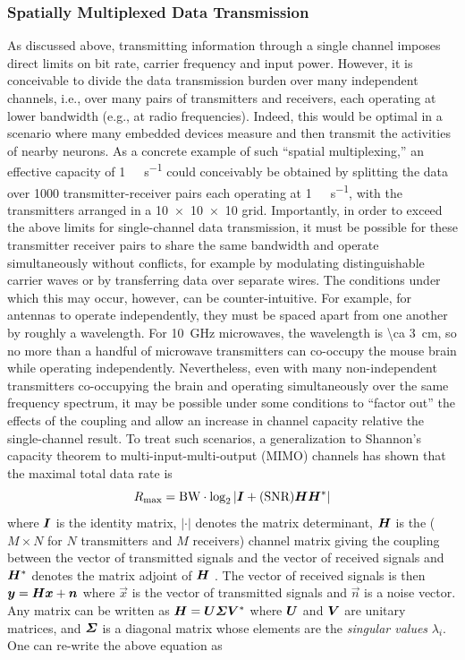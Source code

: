 \subsubsection{Spatially Multiplexed Data Transmission}

As discussed above, transmitting information through a single channel imposes direct limits on bit rate, carrier frequency and input power.
However, it is conceivable to divide the data transmission burden over many independent channels, i.e., over many pairs of transmitters and receivers, each operating at lower bandwidth (e.g., at radio frequencies).
Indeed, this would be optimal in a scenario where many embedded devices measure and then transmit the activities of nearby neurons.
As a concrete example of such ``spatial multiplexing,'' an effective capacity of \SI{1}{\tera\bit\per\second} could conceivably be obtained by splitting the data over \num{1000} transmitter-receiver pairs each operating at \SI{1}{\giga\bit\per\second}, with the transmitters arranged in a \num{10 x 10 x 10} grid.
Importantly, in order to exceed the above limits for single-channel data transmission, it must be possible for these transmitter receiver pairs to share the same bandwidth and operate simultaneously without conflicts, for example by modulating distinguishable carrier waves or by transferring data over separate wires.
The conditions under which this may occur, however, can be counter-intuitive.
For example, for antennas to operate independently, they must be spaced apart from one another by roughly a wavelength.
For \SI{10}{\giga\hertz} microwaves, the wavelength is \SI{\ca 3}{\centi\meter}, so no more than a handful of microwave transmitters can co-occupy the mouse brain while operating independently.
Nevertheless, even with many non-independent transmitters co-occupying the brain and operating simultaneously over the same frequency spectrum, it may be possible under some conditions to ``factor out'' the effects of the coupling and allow an increase in channel capacity relative the single-channel result.
To treat such scenarios, a generalization to Shannon's capacity theorem to multi-input-multi-output (MIMO) channels has shown that the maximal total data rate is
\[R\sub{max} = \BW \cdot \log_2\left| \mat{I} + ( \SNR ) \mat{H}\mat{H}^* \right|\]
where $\mat{I}$ is the identity matrix, $|\cdot|$ denotes the matrix determinant, $\mat{H}$ is the ($M \times N$ for $N$ transmitters and $M$ receivers) channel matrix giving the coupling between the vector of transmitted signals and the vector of received signals and $\mat{H}^*$ denotes the matrix adjoint of $\mat{H}$ \cite{tulino04}. The vector of received signals is then $\vec{y}=\mat{H}\vec{x}+\vec{n}$ where $\vec{x}$ is the vector of transmitted signals and $\vec{n}$ is a noise vector. Any matrix can be written as $\mat{H}=\mat{U}\mat{\Sigma}\mat{V}^*$ where $\mat{U}$ and $\mat{V}$ are unitary matrices, and $\mat{\Sigma}$ is a diagonal matrix whose elements are the \emph{singular values} $\lambda_i$. One can re-write the above equation as
